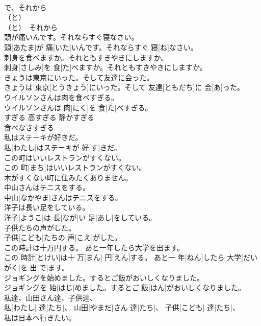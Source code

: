 \documentclass[8pt]{extreport}
\begin{document}
\begin{CJK}{UTF8}{min}
\\	で、それから 
\\	（と）　
\\	（と）　それから　
\\	頭が痛いんです。それならすぐ寝なさい。	
\\	頭[あたま]が 痛[いた]いんです。それならすぐ 寝[ね]なさい。	
\\	刺身を食べますか。それともすきやきにしますか。	
\\	刺身[さしみ]を 食[た]べますか。それともすきやきにしますか。	
\\	きょうは東京にいった。そして友達に会った。	
\\	きょうは 東京[とうきょう]にいった。そして 友達[ともだち]に 会[あ]った。	
\\	ウイルソンさんは肉を食べすぎる。	
\\	ウイルソンさんは 肉[にく]を 食[た]べすぎる。	
\\	すぎる 高すぎる 静かすぎる	
\\	食べなさすぎる
\\	私はステーキが好きだ。	
\\	私[わたし]はステーキが 好[す]きだ。	
\\	この町はいいレストランがすくない。	
\\	この 町[まち]はいいレストランがすくない。	
\\	木がすくない町に住みたくありません。 
\\	中山さんはテニスをする。	
\\	中山[なかやま]さんはテニスをする。	
\\	洋子は長い足をしている。	
\\	洋子[ようこ]は 長[なが]い 足[あし]をしている。	
\\	子供たちの声がした。	
\\	子供[こども]たちの 声[こえ]がした。	
\\	この時計は十万円する。 あと一年したら大学を出ます。	
\\	この 時計[とけい]は十 万[まん] 円[えん]する。 あと一 年[ねん]したら 大学[だいがく]を 出[で]ます。	
\\	ジョギングを始めました。するとご飯がおいしくなりました。	
\\	ジョギングを 始[はじ]めました。するとご 飯[はん]がおいしくなりました。	
\\	私達、山田さん達、子供達、	
\\	私[わたし] 達[たち]、 山田[やまだ]さん 達[たち]、 子供[こども] 達[たち]、	
\\	私は日本へ行きたい。	

\end{CJK}
\end{document}
